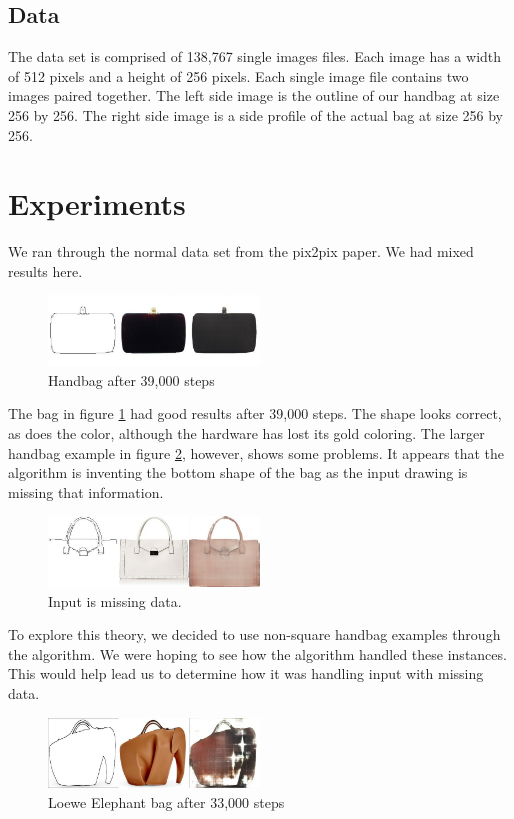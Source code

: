 \documentclass[conference]{IEEEtran}
\begin{document}
\subsection{Data}
The data set is comprised of 138,767 single images files. Each image has a width of 512 pixels and a
height of 256 pixels. Each single image file contains two images paired together. The left side image is
the outline of our handbag at size 256 by 256. The right side image is a side profile of the
actual bag at size 256 by 256.


\section{Experiments}
We ran through the normal data set from the pix2pix \cite{imagetoimage} paper. We had mixed
results here.
\begin{figure}[h]
  \includegraphics[width=0.5\textwidth]{./image_dump_39000.jpg}
  \caption{\label{fig:handbag39} Handbag after 39,000 steps}
  \centering
\end{figure}
The bag in figure \ref{fig:handbag39} had good results after 39,000 steps. The shape looks correct, as does the color, although the hardware has lost its gold coloring. The larger handbag example in figure
\ref{fig:missing-data}, however, shows some problems. It appears that the algorithm is inventing the bottom shape of the bag
as the input drawing is missing that information.
\begin{figure}[h]
  \includegraphics[width=0.5\textwidth]{./bad_result.jpg}
  \caption{\label{fig:missing-data} Input is missing data.}
  \centering
\end{figure}
To explore this theory, we decided to use non-square handbag examples through the algorithm. We were hoping to see how the algorithm handled these instances.
This would help lead us to determine how it was handling input with missing data.
\begin{figure}[h]
  \includegraphics[width=0.5\textwidth]{./bad_elephant_33000.jpg}
  \caption{\label{fig:loewe} Loewe Elephant bag after 33,000 steps}
  \centering
\end{figure}
\end{document}

